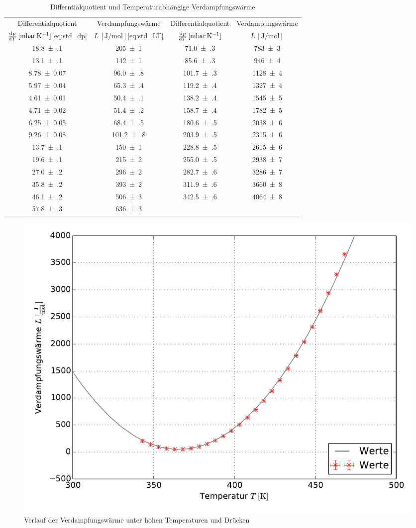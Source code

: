 	\vspace{2cm}
	\begin{table}[!h]
		\centering
		\begin{tabular}{|c|c||c|c|}
			\hline
			Differentialquotient & Verdampfungswärme & Differentialquotient & Verdampungswärme\\
			$\od{p}{T}\,[\si[prefixes-as-symbols = true]{\milli\bar\per\kelvin}]$\eqref{eq:std_dp} & 
			$L\,[\si{\joule\per\mole}]$\eqref{eq:std_LT} & $\od{p}{T}\,[\si[prefixes-as-symbols = true]{\milli\bar\per\kelvin}]$ & 
			$L\,[\si{\joule\per\mole}]$\\ \hline\hline
				\num{18.8(1)}  & \num{205(1)} & \num{71.0(3)}  & \num{783(3)} \\
				\num{13.1(1)}  & \num{142(1)} & \num{85.6(3)}  & \num{946(4)} \\
				\num{8.78(7)}  & \num{96.0(8)} &\num{101.7(3)}  & \num{1128(4)} \\
				\num{5.97(4)}  & \num{65.3(4)} &\num{119.2(4)}  & \num{1327(4)} \\
				\num{4.61(1)}  & \num{50.4(1)} &\num{138.2(4)}  & \num{1545(5)} \\
				\num{4.71(2)}  & \num{51.4(2)} &\num{158.7(4)}  & \num{1782(5)} \\
				\num{6.25(5)}  & \num{68.4(5)} &\num{180.6(5)}  & \num{2038(6)} \\
				\num{9.26(8)}  & \num{101.2(8)} &\num{203.9(5)}  & \num{2315(6)} \\
				\num{13.7(1)}  & \num{150(1)} &\num{228.8(5)}  & \num{2615(6)} \\
				\num{19.6(1)}  & \num{215(2)} &\num{255.0(5)}  & \num{2938(7)} \\
				\num{27.0(2)}  & \num{296(2)} &\num{282.7(6)}  & \num{3286(7)} \\
				\num{35.8(2)}  & \num{393(2)} &\num{311.9(6)}  & \num{3660(8)} \\
				\num{46.1(2)}  & \num{506(3)} &\num{342.5(6)}  & \num{4064(8)} \\
				\num{57.8(3)}  & \num{636(3)} & & \\
			\hline
		\end{tabular}
		\caption{Differntialquotient und Temperaturabhängige Verdampfungswärme \label{tab:L_dpdT}}
	\end{table}

	
	\begin{figure}[!h]
		\centering
		\includegraphics[scale=0.75]{Grafiken/Verlauf_LT.pdf}
		\caption{Verlauf der Verdampfungswärme unter hohen Temperaturen und Drücken}
		\label{fig:L_T}
	\end{figure}
